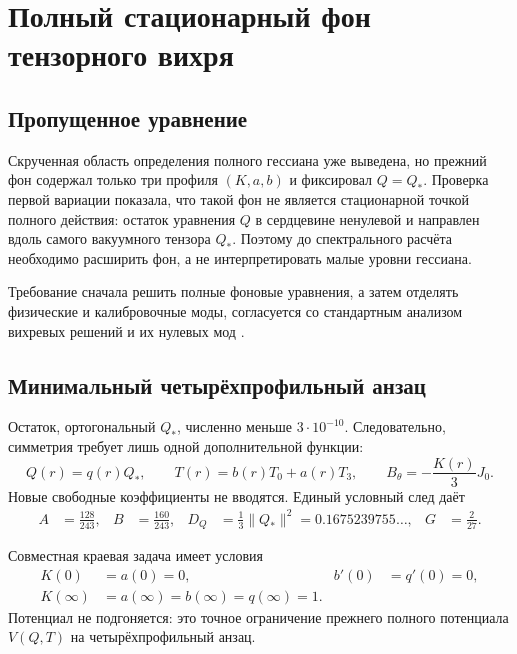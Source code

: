 \chapter{Полный стационарный фон тензорного вихря}
\label{ch:v6-bosonic-defect-full-tensor-stationary-background-gate}

\section{Пропущенное уравнение}

Скрученная область определения полного гессиана уже выведена, но прежний
фон содержал только три профиля $(K,a,b)$ и фиксировал $Q=Q_*$. Проверка
первой вариации показала, что такой фон не является стационарной точкой
полного действия: остаток уравнения $Q$ в сердцевине ненулевой и направлен
вдоль самого вакуумного тензора $Q_*$. Поэтому до спектрального расчёта
необходимо расширить фон, а не интерпретировать малые уровни гессиана.

Требование сначала решить полные фоновые уравнения, а затем отделять
физические и калибровочные моды, согласуется со стандартным анализом
вихревых решений и их нулевых мод
\cite{stationary-background-alonso,stationary-background-a4-vortex}.

\section{Минимальный четырёхпрофильный анзац}

Остаток, ортогональный $Q_*$, численно меньше $3\cdot10^{-10}$. Следовательно,
симметрия требует лишь одной дополнительной функции:
\begin{equation}
 Q(r)=q(r)Q_*,
 \qquad
 T(r)=b(r)T_0+a(r)T_3,
 \qquad
 B_\theta=-\frac{K(r)}3J_0.
\end{equation}
Новые свободные коэффициенты не вводятся. Единый условный след даёт
\begin{align}
 A&=\frac{128}{243},&
 B&=\frac{160}{243},&
 D_Q&=\frac13\|Q_*\|^2=0.1675239755\ldots,&
 G&=\frac2{27}.
\end{align}

Совместная краевая задача имеет условия
\begin{align}
 K(0)&=a(0)=0,& b'(0)&=q'(0)=0,\\
 K(\infty)&=a(\infty)=b(\infty)=q(\infty)=1.
\end{align}
Потенциал не подгоняется: это точное ограничение прежнего полного
потенциала $V(Q,T)$ на четырёхпрофильный анзац.

